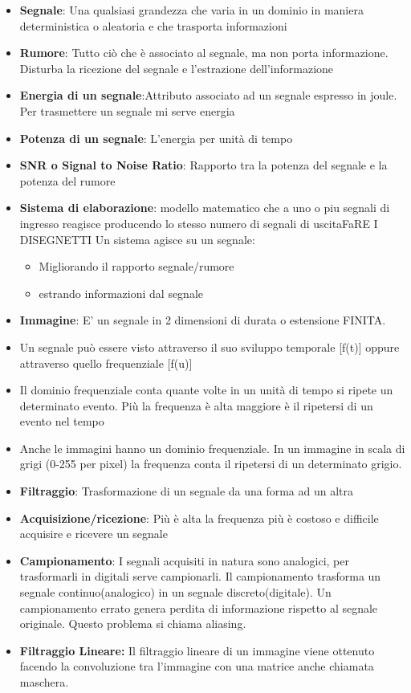 \documentclass{article}
\begin{document}
    \begin{itemize}
        \item \textbf{Segnale}: Una qualsiasi grandezza che varia in un dominio in maniera deterministica o aleatoria e che trasporta informazioni
        \item \textbf{Rumore}: Tutto ciò che è associato al segnale, ma non porta informazione. Disturba la ricezione del segnale e l'estrazione dell'informazione
        \item \textbf{Energia di un segnale}:Attributo associato ad un segnale espresso in joule. Per trasmettere un segnale mi serve energia
        \item \textbf{Potenza di un segnale}: L'energia per unità di tempo
        \item \textbf{SNR o Signal to Noise Ratio}: Rapporto tra la potenza del segnale e la potenza del rumore
        \item \textbf{Sistema di elaborazione}: modello  matematico che a uno o piu segnali di ingresso reagisce producendo lo stesso numero di segnali di uscita{\Large FaRE I DISEGNETTI}
        Un sistema agisce su un segnale:
        \begin{itemize}
            \item Migliorando il rapporto segnale/rumore
            \item estrando informazioni dal segnale
        \end{itemize}
        \item \textbf{Immagine}: E' un segnale in 2 dimensioni di durata o estensione FINITA.
        \item Un segnale può essere visto attraverso il suo sviluppo temporale [f(t)] oppure attraverso quello frequenziale [f(u)]
        \item Il dominio frequenziale conta quante volte in un unità di tempo si ripete un determinato evento. Più la frequenza è alta maggiore è il ripetersi di un evento nel tempo
        \item Anche le immagini hanno un dominio frequenziale. In un immagine in scala di grigi (0-255 per pixel) la frequenza conta il ripetersi di un determinato grigio.
        \item \textbf{Filtraggio}: Trasformazione di un segnale da una forma ad un altra
        \item \textbf{Acquisizione/ricezione}: Più è alta la frequenza più è costoso e difficile acquisire e ricevere un segnale
        \item \textbf{Campionamento}: I segnali acquisiti in natura sono analogici, per trasformarli in digitali serve campionarli.
        Il campionamento trasforma un segnale continuo(analogico) in un segnale discreto(digitale).
        Un campionamento errato genera perdita di informazione rispetto al segnale originale. Questo problema si chiama aliasing.
        \item \textbf{Filtraggio Lineare:} Il filtraggio lineare di un immagine viene ottenuto facendo la convoluzione tra l'immagine con una matrice anche chiamata maschera.
    \end{itemize}
\end{document}
